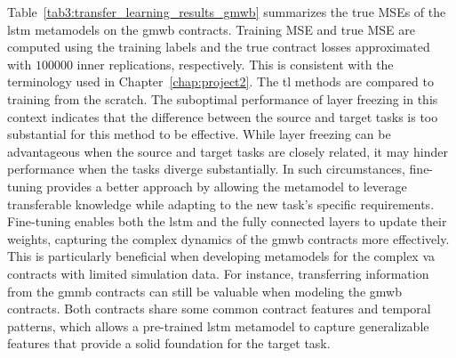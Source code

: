 Table~\ref{tab3:transfer_learning_results_gmwb} summarizes the true MSEs of the \gls{lstm} metamodels on the \gls{gmwb} contracts.
Training MSE and true MSE are computed using the training labels and the true contract losses approximated with $\num{100000}$ inner replications, respectively.
This is consistent with the terminology used in Chapter~\ref{chap:project2}.
The \gls{tl} methods are compared to training from the scratch.
The suboptimal performance of layer freezing in this context indicates that the difference between the source and target tasks is too substantial for this method to be effective. 
While layer freezing can be advantageous when the source and target tasks are closely related, it may hinder performance when the tasks diverge substantially.
In such circumstances, fine-tuning provides a better approach by allowing the metamodel to leverage transferable knowledge while adapting to the new task's specific requirements. 
Fine-tuning enables both the \gls{lstm} and the fully connected layers to update their weights, capturing the complex dynamics of the \gls{gmwb} contracts more effectively.
This is particularly beneficial when developing metamodels for the complex \gls{va} contracts with limited simulation data. 
For instance, transferring information from the \gls{gmmb} contracts can still be valuable when modeling the \gls{gmwb} contracts.
Both contracts share some common contract features and temporal patterns, which allows a pre-trained \gls{lstm} metamodel to capture generalizable features that provide a solid foundation for the target task.


